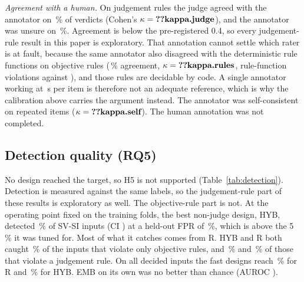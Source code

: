 \documentclass[conference]{IEEEtran}
\begin{document}
\emph{Agreement with a human.}\ifhumanlabels{} On judgement rules the judge agreed with the annotator
on \,\% of  verdicts (Cohen's $\kappa=\R{kappa.judge}$), and the annotator
was unsure on \,\%. \ifjudgeweak Agreement is below the pre-registered 0.4, so every
judgement-rule result in this paper is exploratory.\fi{} That annotation cannot settle which rater is
at fault, because the same annotator also disagreed with the deterministic rule functions on objective
rules (\,\% agreement, $\kappa=\R{kappa.rules}$,  rule-function
violations against ), and those rules are decidable by code. A single annotator
working at \,s per item is therefore not an adequate reference, which is why the
calibration above carries the argument instead. The annotator was self-consistent on repeated items
($\kappa=\R{kappa.self}$).\else{} The human annotation was not completed.\fi


\subsection{Detection quality (RQ5)}

No design reached the target, so H5 is not supported (Table~\ref{tab:detection}).\ifjudgeweak{}
Detection is measured against the same labels, so the judgement-rule part of these results is
exploratory as well. The objective-rule part is not.\fi{} At the operating point fixed on the training
folds, the best non-judge design, HYB, detected \,\% of SV-SI inputs (CI
) at a held-out FPR of \,\%, which is above the 5\,\% it was tuned for. Most
of what it catches comes from R. HYB and R both caught \,\% of the inputs that violate
only objective rules, and \,\% and \,\% of those that violate a judgement
rule. On all decided inputs the fast designs reach \,\% for R and
\,\% for HYB. EMB on its own was no better than chance (AUROC
).
\end{document}
